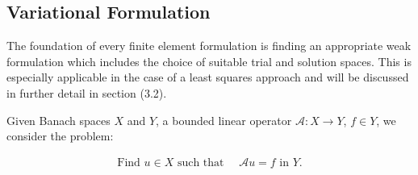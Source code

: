 \documentclass[../draft_1.tex]{subfiles}
\begin{document}

\subsection{Variational Formulation}

The foundation of every finite element formulation is finding an appropriate weak formulation which includes the choice of suitable trial and solution spaces. This is especially applicable in the case of a least squares approach and will be discussed in further detail in section (3.2). 

Given Banach spaces $X$ and $Y$, a bounded linear operator $\mathcal{A} : X \rightarrow Y$, $f \in Y$, we consider the problem:
\begin{ceqn}
\begin{align}
\label{basic_strong_form}
\text{Find } u \in X \text{ such that } \quad \mathcal{A} u = f \text{ in } Y.
\end{align}
\end{ceqn}
\end{document}
